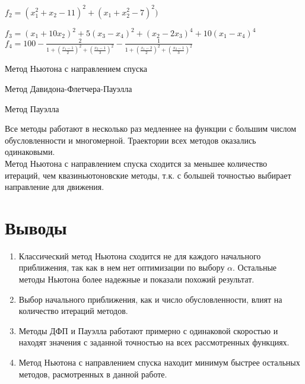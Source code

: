 \(f_2 = (x_1^2 + x_2 - 11)^2 + (x_1 + x_2^2 - 7)^2)\)\\

\(f_3 = (x_1 + 10x_2)^2 + 5(x_3 - x_4)^2 + (x_2 - 2x_3)^4 + 10(x_1 - x_4)^4\)\\

\(f_4 = 100 - \frac{2}{1 + (\frac{x_1 - 1}{2})^2 + (\frac{x_2 - 1}{3})^2} - \frac{1}{1 + (\frac{x_1 - 2}{2})^2 + (\frac{x_2 - 1}{3})^2}\)\\

Метод Ньютона с направлением спуска\\

Метод Давидона-Флетчера-Пауэлла\\

Метод Пауэлла\\

Все методы работают в несколько раз медленнее на функции с большим числом обусловленности и многомерной. Траектории всех методов оказались одинаковыми.\\
Метод Ньютона с направлением спуска сходится за меньшее количество итераций, чем квазиньютоновские методы, т.к. с большей точностью выбирает направление для движения.

\newpage 

\section{Выводы}

\begin{enumerate}
	\item Классический метод Ньютона сходится не для каждого начального приближения, так как в нем нет оптимизации по выбору $\alpha$. Остальные методы Ньютона более надежные и показали похожий результат.
	
	\item Выбор начального приближения, как и число обусловленности, влият на количество итераций методов.
	
	\item Методы ДФП и Пауэлла работают примерно с одинаковой скоростью и находят значения с заданной точностью на всех рассмотренных функциях.
	
	\item Метод Ньютона с направлением спуска находит минимум быстрее остальных методов, расмотренных в данной работе.
\end{enumerate}

